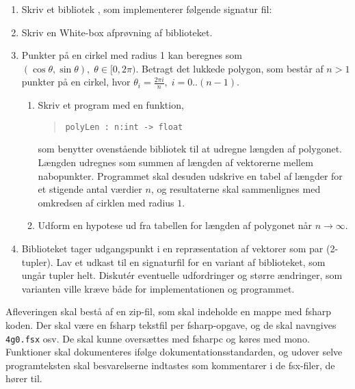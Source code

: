 \documentclass[a4paper,12pt]{article}
\begin{document}
\begin{enumerate}[label=4g.\arabic*,start=0]
\item Skriv et bibliotek , som implementerer følgende signatur fil:
\item Skriv en White-box afprøvning af biblioteket.
\item Punkter på en cirkel med radius 1 kan beregnes som $(\cos \theta, \sin \theta), \;\theta\in [0,2\pi)$. Betragt det lukkede polygon, som består af $n>1$ punkter på en cirkel, hvor $\theta_i = \frac{2\pi i}{n},\; i = 0..(n-1)$. 
  \begin{enumerate}
  \item Skriv et program med en funktion,
  \begin{quote}
    \lstinline{polyLen : n:int -> float}
  \end{quote}
som benytter ovenstående bibliotek til at udregne længden af polygonet. Længden udregnes som summen af længden af vektorerne mellem nabopunkter. Programmet skal desuden udskrive en tabel af længder for et stigende antal værdier $n$, og resultaterne skal sammenlignes med omkredsen af cirklen med radius $1$. 
\item Udform en hypotese ud fra tabellen for længden af polygonet når $n\rightarrow\infty$.
  \end{enumerate}
\item Biblioteket  tager udgangspunkt i en repræsentation af vektorer som par (2-tupler). Lav et udkast til en signaturfil for en variant af biblioteket, som ungår tupler helt. Diskut\'{e}r eventuelle udfordringer og større ændringer, som varianten ville kræve både for implementationen og programmet.
\end{enumerate}
Afleveringen skal bestå af en zip-fil, som skal indeholde en mappe med fsharp koden. Der skal være en fsharp tekstfil per fsharp-opgave, og de skal navngives \verb|4g0.fsx| osv. De skal kunne oversættes med fsharpc og køres med mono. Funktioner skal dokumenteres ifølge dokumentationsstandarden, og udover selve programteksten skal besvarelserne indtastes som kommentarer i de fsx-filer, de hører til.
\end{document}
